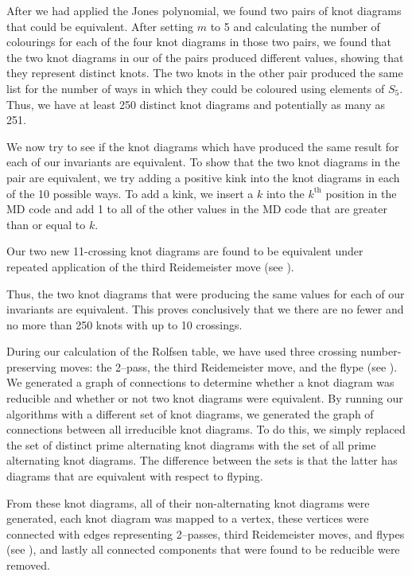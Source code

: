 \begin{paper}

After we had applied the Jones polynomial, we found two pairs of knot diagrams
that could be equivalent.
After setting $m$ to 5 and calculating the number of colourings for each of the
four knot diagrams in those two pairs, we found that the two knot diagrams in
our of the pairs produced different values, showing that they represent distinct
knots.
The two knots in the other pair produced the same list for the number of ways in
which they could be coloured using elements of $S_5$.
Thus, we have at least 250 distinct knot diagrams and potentially as many as
251.

We now try to see if the knot diagrams which have produced the same result for
each of our invariants are equivalent.
To show that the two knot diagrams in the pair are equivalent, we try adding a
positive kink into the knot diagrams in each of the 10 possible ways.
To add a kink, we insert a $k$ into the $k^\text{th}$ position in the MD code
and add 1 to all of the other values in the MD code that are greater than or
equal to $k$.


Our two new 11-crossing knot diagrams are found to be equivalent under repeated
application of the third Reidemeister move (see \figMoves).


Thus, the two knot diagrams that were producing the same values for each of our
invariants are equivalent.
This proves conclusively that we there are no fewer and no more than 250 knots
with up to 10 crossings.



During our calculation of the Rolfsen table, we have used three crossing
number-preserving moves: the 2--pass, the third Reidemeister move, and the flype
(see \figMoves).
We generated a graph of connections to determine whether a knot diagram was
reducible and whether or not two knot diagrams were equivalent.
By running our algorithms with a different set of knot diagrams, we generated
the graph of connections between all irreducible knot diagrams.
To do this, we simply replaced the set of distinct prime alternating knot
diagrams with the set of all prime alternating knot diagrams.
The difference between the sets is that the latter has diagrams that are
equivalent with respect to flyping.

From these knot diagrams, all of their non-alternating knot diagrams were
generated, each knot diagram was mapped to a vertex, these vertices were
connected with edges representing 2--passes, third Reidemeister moves, and
flypes (see \figMoves), and lastly all connected components that were found to
be reducible were removed.


\end{paper}
